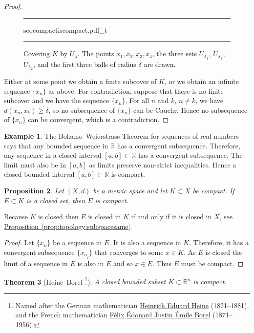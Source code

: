 \documentclass[12pt,openany]{book}
\newcommand{\R}{{\mathbb{R}}}
\theoremstyle{plain}
\newtheorem{thm}{Theorem}[section]
\newtheorem{prop}[thm]{Proposition}
\theoremstyle{remark}
\theoremstyle{definition}
\newenvironment{myfig}{%
\begin{figure}[h!t]
\noindent\rule{\textwidth}{0.4pt}\vspace{12pt}\par\centering}%
{\par\noindent\rule{\textwidth}{0.4pt}
\end{figure}}
\theoremstyle{exercise}
\theoremstyle{example}
\newtheorem{example}[thm]{Example}
\newcommand{\propref}[1]{\hyperref[#1]{Proposition~\ref*{#1}}}
\begin{document}
\begin{proof}
\begin{myfig}
{seqcompactiscompact.pdf_t}
\caption{Covering $K$ by $U_{\lambda}$.  The points
$x_1,x_2,x_3,x_4$, 
the three sets 
$U_{\lambda_1}$,
$U_{\lambda_2}$,
$U_{\lambda_2}$,
and 
the first three balls
of radius $\delta$ are drawn.\label{fig:seqcompactiscompact}}
\end{myfig}

Either at some point we obtain a finite subcover of $K$,
or we obtain an
infinite
sequence $\{ x_n \}$ as above.
For contradiction, suppose that
there is no finite subcover and we have the sequence $\{ x_n \}$.
For all $n$ and $k$, $n \not= k$, 
we have $d(x_n,x_k) \geq \delta$,
so no subsequence of $\{ x_n \}$ can be
Cauchy.  Hence no subsequence of $\{ x_n \}$ can be convergent,
which is a contradiction.
\end{proof}

\begin{example}
The Bolzano--Weierstrass Theorem for sequences of real numbers
says that any bounded sequence in $\R$ has a convergent
subsequence.  Therefore, any sequence in a closed interval $[a,b] \subset \R$ has 
a convergent subsequence.  The limit must also be in $[a,b]$ as limits
preserve non-strict inequalities.  Hence a closed bounded interval $[a,b]
\subset \R$ is compact.
\end{example}

\begin{prop}
Let $(X,d)$ be a metric space and let $K \subset X$ be compact.  If
$E \subset K$ is a closed set, then $E$ is compact.
\end{prop}

Because $K$ is closed then $E$ is closed in $K$ if
and only if it is closed in $X$,
see \propref{prop:topology:subspacesame}.

\begin{proof}
Let $\{ x_n \}$ be a sequence in $E$.  It is also a sequence in $K$.
Therefore, it has a convergent subsequence $\{ x_{n_j} \}$ that converges to
some $x \in K$.  As $E$ is closed the limit of a sequence in $E$ is also in $E$
and so $x \in E$.  Thus $E$ must be compact.
\end{proof}

\begin{thm}[Heine--Borel%
\footnote{Named after the German mathematician 
\href{https://en.wikipedia.org/wiki/Eduard_Heine}{Heinrich Eduard Heine}
(1821--1881),
and the French mathematician
\href{https://en.wikipedia.org/wiki/\%C3\%89mile_Borel}{F\'elix \'Edouard Justin \'Emile Borel}
(1871--1956).}]%
\label{thm:msbw}
A closed bounded subset $K \subset \R^n$ is compact.
\end{thm}
\end{document}
